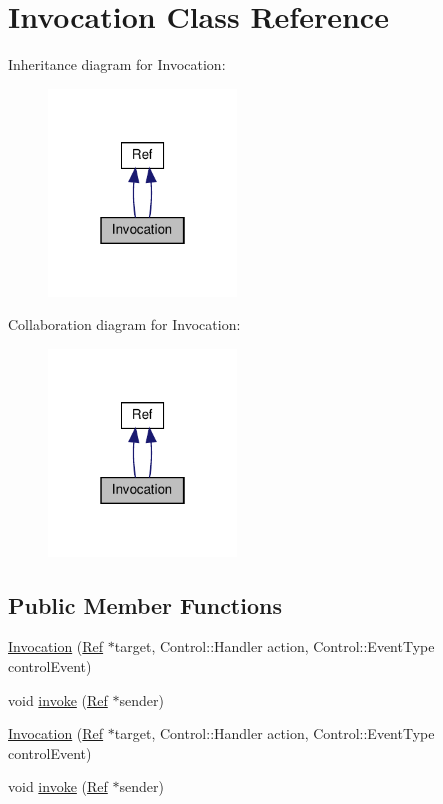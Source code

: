 \hypertarget{classInvocation}{}\section{Invocation Class Reference}
\label{classInvocation}


Inheritance diagram for Invocation\+:
\nopagebreak
\begin{figure}[H]
\begin{center}
\leavevmode
\includegraphics[width=142pt]{classInvocation__inherit__graph}
\end{center}
\end{figure}


Collaboration diagram for Invocation\+:
\nopagebreak
\begin{figure}[H]
\begin{center}
\leavevmode
\includegraphics[width=142pt]{classInvocation__coll__graph}
\end{center}
\end{figure}
\subsection*{Public Member Functions}
\begin{DoxyCompactItemize}
\item 
\hyperlink{classInvocation_ae382b61bb50269810336e5fcca6ffe1f}{Invocation} (\hyperlink{classRef}{Ref} $\ast$target, Control\+::\+Handler action, Control\+::\+Event\+Type control\+Event)
\item 
void \hyperlink{classInvocation_a4f3ed4c727f5737ba2fe94df53bd4a37}{invoke} (\hyperlink{classRef}{Ref} $\ast$sender)
\item 
\hyperlink{classInvocation_ae382b61bb50269810336e5fcca6ffe1f}{Invocation} (\hyperlink{classRef}{Ref} $\ast$target, Control\+::\+Handler action, Control\+::\+Event\+Type control\+Event)
\item 
void \hyperlink{classInvocation_a4f3ed4c727f5737ba2fe94df53bd4a37}{invoke} (\hyperlink{classRef}{Ref} $\ast$sender)
\end{DoxyCompactItemize}
